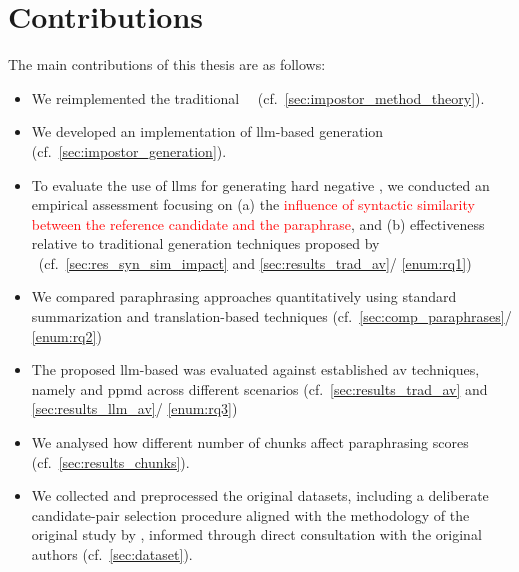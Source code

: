 


\section{Contributions}
\label{sec:contributions}
The main contributions of this thesis are as follows:
\begin{itemize}
    \item We reimplemented the traditional \impAppr{}~\citep{koppel_determining_2014}\ (cf.~\autoref{sec:impostor_method_theory}).
    \item We developed an implementation of \ac{llm}-based \imp{} generation (cf.~\autoref{sec:impostor_generation}). 
    \item To evaluate the use of \acp{llm} for generating hard negative \imps{}, we conducted an empirical assessment focusing on (a) the \textcolor{red}{influence of syntactic similarity between the reference candidate and the paraphrase}, and (b) effectiveness relative to traditional \imp{} generation techniques proposed by \citet{koppel_determining_2014}\ (cf.~\autoref{sec:res_syn_sim_impact} and \autoref{sec:results_trad_av}/ \ref{enum:rq1})
    \item We compared paraphrasing approaches quantitatively using standard summarization and translation-based techniques (cf.~\autoref{sec:comp_paraphrases}/ \ref{enum:rq2})
    \item The proposed \ac{llm}-based \impAppr{} was evaluated against established \ac{av} techniques, namely \unmasking{} and \ac{ppmd} across different scenarios (cf.~\autoref{sec:results_trad_av} and \autoref{sec:results_llm_av}/ \ref{enum:rq3})
    \item We analysed how different number of chunks affect paraphrasing scores (cf.~\autoref{sec:results_chunks}).
    \item We collected and preprocessed the original datasets, including a deliberate candidate-pair selection procedure aligned with the methodology of the original study by \citet{koppel_determining_2014}, informed through direct consultation with the original authors (cf.~\autoref{sec:dataset}).
\end{itemize}



